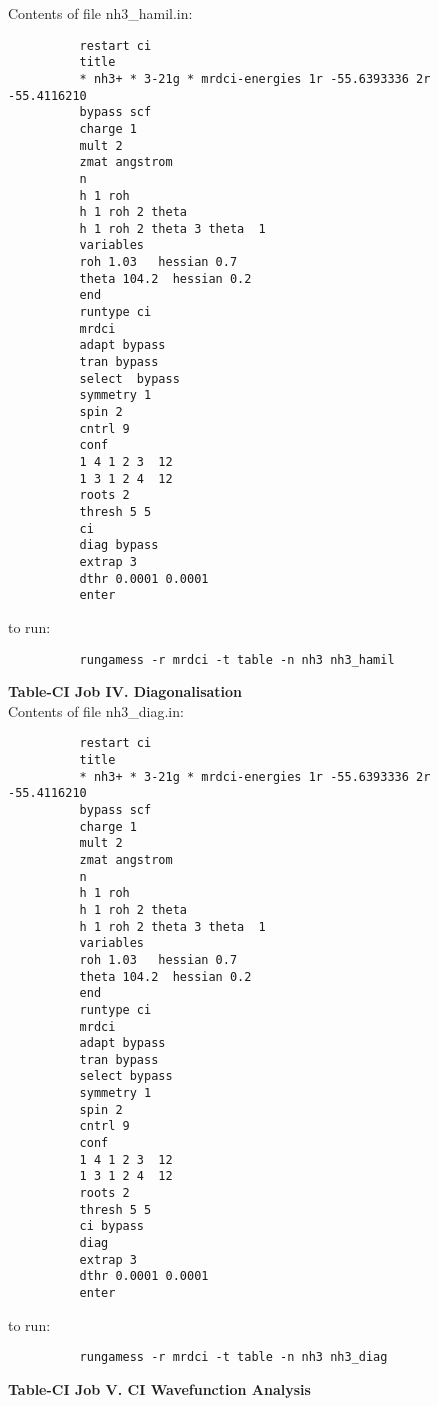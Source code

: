 \documentclass[11pt,fleqn]{article}
\begin{document}
Contents of file nh3\_hamil.in:
{
\footnotesize
\begin{verbatim}
          restart ci
          title
          * nh3+ * 3-21g * mrdci-energies 1r -55.6393336 2r -55.4116210
          bypass scf
          charge 1
          mult 2
          zmat angstrom
          n
          h 1 roh
          h 1 roh 2 theta
          h 1 roh 2 theta 3 theta  1
          variables
          roh 1.03   hessian 0.7
          theta 104.2  hessian 0.2
          end
          runtype ci
          mrdci
          adapt bypass
          tran bypass
          select  bypass
          symmetry 1
          spin 2
          cntrl 9
          conf
          1 4 1 2 3  12
          1 3 1 2 4  12
          roots 2
          thresh 5 5
          ci
          diag bypass
          extrap 3
          dthr 0.0001 0.0001
          enter
\end{verbatim}
}
to run:
{
\footnotesize
\begin{verbatim}
          rungamess -r mrdci -t table -n nh3 nh3_hamil
\end{verbatim}
}
{\bf Table-CI Job IV. Diagonalisation}\\

Contents of file nh3\_diag.in:
{
\footnotesize
\begin{verbatim}
          restart ci
          title
          * nh3+ * 3-21g * mrdci-energies 1r -55.6393336 2r -55.4116210
          bypass scf
          charge 1
          mult 2
          zmat angstrom
          n
          h 1 roh
          h 1 roh 2 theta
          h 1 roh 2 theta 3 theta  1
          variables
          roh 1.03   hessian 0.7
          theta 104.2  hessian 0.2
          end
          runtype ci
          mrdci
          adapt bypass
          tran bypass
          select bypass
          symmetry 1
          spin 2
          cntrl 9
          conf
          1 4 1 2 3  12
          1 3 1 2 4  12
          roots 2
          thresh 5 5
          ci bypass
          diag 
          extrap 3
          dthr 0.0001 0.0001
          enter
\end{verbatim}
}
to run:
{
\footnotesize
\begin{verbatim}
          rungamess -r mrdci -t table -n nh3 nh3_diag
\end{verbatim}
}
{\bf Table-CI Job V. CI Wavefunction Analysis}\\
\end{document}
